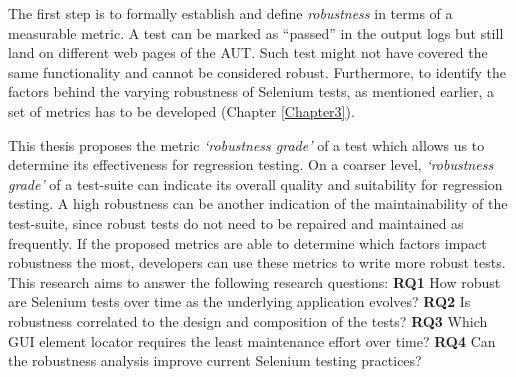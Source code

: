 



The first step is to formally establish and define \textit{robustness} in terms of a measurable metric. A test can be marked as ``passed'' in the output logs but still land on different web pages of the AUT. Such test might not have covered the same functionality and cannot be considered robust. Furthermore, to identify the factors behind the varying robustness of Selenium tests, as mentioned earlier, a set of metrics has to be developed (Chapter \ref{Chapter3}). 

This thesis proposes the metric \textit{`robustness grade'} of a test which allows us to determine its effectiveness for regression testing. On a coarser level, \textit{`robustness grade'} of a test-suite can indicate its overall quality and suitability for regression testing. A high robustness can be another indication of the maintainability of the test-suite, since robust tests do not need to be repaired and maintained as frequently. If the proposed metrics are able to determine which factors impact robustness the most, developers can use these metrics to write more robust tests. This research aims to answer the following research questions:
\newline
{\bfseries RQ1} How robust are Selenium tests over time as the underlying application evolves?  \newline
{\bfseries RQ2} Is robustness correlated to the design and composition of the tests?\newline
{\bfseries RQ3} Which GUI element locator requires the least maintenance effort over time?\newline
{\bfseries RQ4} Can the robustness analysis improve current Selenium testing practices?\newline

